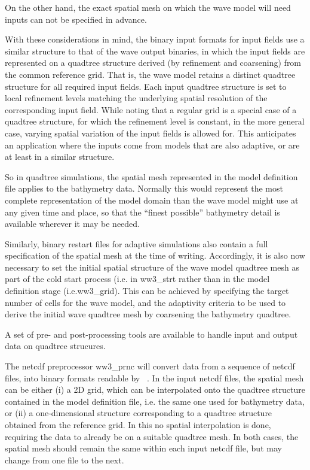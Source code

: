 On the other hand, the exact spatial mesh on which the wave model will 
need inputs can not be specified in advance.

With these considerations in mind, the binary input formats for input
fields use a similar structure to that of the wave output binaries, 
in which the input fields are represented on a quadtree structure 
derived (by refinement and coarsening) from the common reference grid. 
That is, the wave model retains a distinct quadtree structure for all
required input fields.
Each input quadtree structure is set to local refinement levels matching
the underlying spatial resolution of the corresponding input field.
While noting that a regular grid is a special case of a quadtree 
structure, for which the refinement level is constant,
in the more general case, varying spatial variation of the input fields is 
allowed for.
This anticipates an application where the inputs come from models that
are also adaptive, or are at least in a similar structure. 

So in quadtree simulations, the spatial mesh represented in the model 
definition file applies to the bathymetry data. Normally this would 
represent the most complete representation of the model domain 
than the wave model might use at any given time and place, so that
the ``finest possible'' bathymetry detail is available wherever
it may be needed.

Similarly, binary restart files for adaptive simulations also contain a 
full specification of the spatial mesh at the time of writing. 
Accordingly, it is also now necessary to set the initial spatial
structure of the wave model quadtree mesh as part of the cold start 
process (i.e. in {\code ww3\_strt} rather than in the model definition 
stage (i.e.{\code ww3\_grid}).
This can be achieved by specifying the target number of cells for the
wave model, and the adaptivity criteria to be used to derive the
initial wave quadtree mesh by coarsening the bathymetry quadtree.

A set of pre- and post-processing tools are available to handle input 
and output data on quadtree strucures.

The netcdf preprocessor {\code ww3\_prnc} will convert data from a
sequence of netcdf files, into binary formats readable by \ws\ .
In the input netcdf files, the spatial mesh can be either 
(i) a 2D grid, which can be interpolated onto the quadtree structure 
contained in the model definition file, i.e. the same one used for 
bathymetry data, or
(ii) a one-dimensional structure corresponding to a quadtree structure
obtained from the reference grid. In this no spatial interpolation is done, 
requiring the data to already be on a suitable quadtree mesh.
In both cases, the spatial mesh should remain the same within each 
input netcdf file, but may change from one file to the next.

